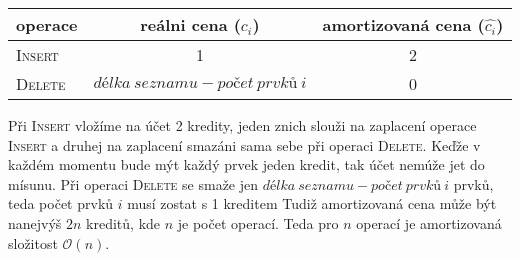\documentclass[12pt]{iv003}
\begin{document}
\begin{enumerate}
	\begin{center}
	\begin{tabular}{ l | c | c }
		operace 			&	reálni cena ($c_{i}$)	& 	amortizovaná cena ($\widehat{c_{i}}$) \\ \hline \hline
		\textsc{Insert} 	& 	1						&	2 \\
		\textsc{Delete}		&	$délka\ seznamu - počet\ prvků\ i$					&	0 \\ \hline 
	\end{tabular}
	\end{center}
	
	Při \textsc{Insert} vložíme na účet 2 kredity, jeden znich slouži na zaplacení operace \textsc{Insert} a druhej na zaplacení smazáni sama sebe při operaci \textsc{Delete}. Keďže v každém momentu bude mýt každý prvek jeden kredit, tak účet nemúže jet do mísunu. Při operaci \textsc{Delete} se smaže jen $délka\ seznamu - počet\ prvků\ i$ prvků, teda počet prvků $i$ musí zostat s 1 kreditem Tudiž amortizovaná cena může být nanejvýš $2n$ kreditů, kde $n$ je počet operací. Teda pro $n$ operací je amortizovaná složitost $\mathcal{O}(n)$.
	
\end{enumerate}
\end{document}
